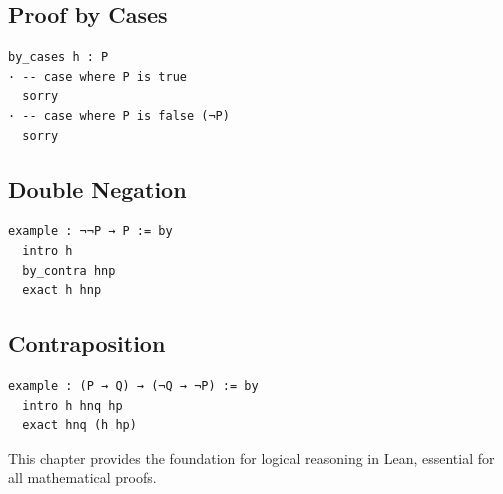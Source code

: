 \documentclass{amsart}
\theoremstyle{plain}
\theoremstyle{definition}
\theoremstyle{remark}
\begin{document}
\subsection{Proof by Cases}

\begin{lstlisting}[language=lean]
by_cases h : P
· -- case where P is true
  sorry
· -- case where P is false (¬P)
  sorry
\end{lstlisting}
\subsection{Double Negation}

\begin{lstlisting}[language=lean]
example : ¬¬P → P := by
  intro h
  by_contra hnp
  exact h hnp
\end{lstlisting}
\subsection{Contraposition}

\begin{lstlisting}[language=lean]
example : (P → Q) → (¬Q → ¬P) := by
  intro h hnq hp
  exact hnq (h hp)
\end{lstlisting}
This chapter provides the foundation for logical reasoning in Lean, essential for all mathematical proofs.
\end{document}

